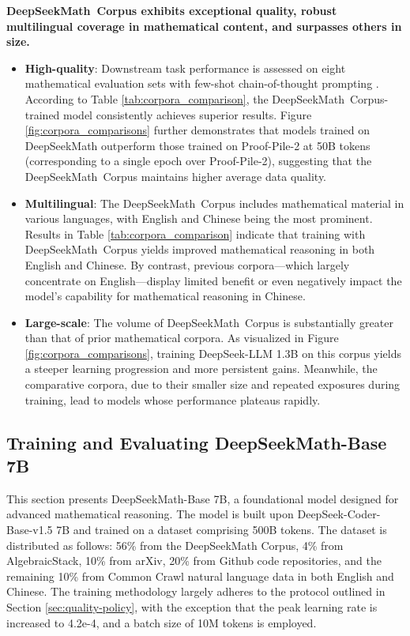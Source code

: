 \textbf{DeepSeekMath~Corpus exhibits exceptional quality, robust multilingual coverage in mathematical content, and surpasses others in size.}

\begin{itemize}[topsep=0pt]
    \item \textbf{High-quality}: Downstream task performance is assessed on eight mathematical evaluation sets with few-shot chain-of-thought prompting \cite{cot}. According to Table \ref{tab:corpora_comparison}, the DeepSeekMath~Corpus-trained model consistently achieves superior results. Figure \ref{fig:corpora_comparisons} further demonstrates that models trained on DeepSeekMath outperform those trained on Proof-Pile-2 at 50B tokens (corresponding to a single epoch over Proof-Pile-2), suggesting that the DeepSeekMath~Corpus maintains higher average data quality.
    \item \textbf{Multilingual}: The DeepSeekMath~Corpus includes mathematical material in various languages, with English and Chinese being the most prominent. Results in Table \ref{tab:corpora_comparison} indicate that training with DeepSeekMath~Corpus yields improved mathematical reasoning in both English and Chinese. By contrast, previous corpora—which largely concentrate on English—display limited benefit or even negatively impact the model’s capability for mathematical reasoning in Chinese.
    \item \textbf{Large-scale}: The volume of DeepSeekMath~Corpus is substantially greater than that of prior mathematical corpora. As visualized in Figure \ref{fig:corpora_comparisons}, training DeepSeek-LLM 1.3B on this corpus yields a steeper learning progression and more persistent gains. Meanwhile, the comparative corpora, due to their smaller size and repeated exposures during training, lead to models whose performance plateaus rapidly.
\end{itemize}

\subsection{Training and Evaluating DeepSeekMath-Base 7B}

This section presents DeepSeekMath-Base 7B, a foundational model designed for advanced mathematical reasoning. The model is built upon DeepSeek-Coder-Base-v1.5 7B \citep{deepseek-coder} and trained on a dataset comprising 500B tokens. The dataset is distributed as follows: 56\% from the DeepSeekMath Corpus, 4\% from AlgebraicStack, 10\% from arXiv, 20\% from Github code repositories, and the remaining 10\% from Common Crawl natural language data in both English and Chinese. The training methodology largely adheres to the protocol outlined in Section \ref{sec:quality-policy}, with the exception that the peak learning rate is increased to 4.2e-4, and a batch size of 10M tokens is employed.

